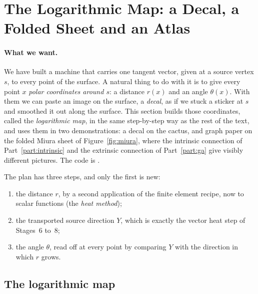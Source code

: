 \label{part:applications}

\section{The Logarithmic Map: a Decal, a Folded Sheet and an Atlas}
\label{section:app_logmap}

\paragraph{What we want.} We have built a machine that carries one tangent vector, given at a source vertex $s$, to every point of the surface. A natural thing to do with it is to give every point $x$ \emph{polar coordinates around $s$}: a distance $r(x)$ and an angle $\theta(x)$. With them we can paste an image on the surface, a \emph{decal}, as if we stuck a sticker at $s$ and smoothed it out along the surface. This section builds those coordinates, called the \emph{logarithmic map}, in the same step-by-step way as the rest of the text, and uses them in two demonstrations: a decal on the cactus, and graph paper on the folded Miura sheet of Figure~\ref{fig:miura}, where the intrinsic connection of Part~\ref{part:intrinsic} and the extrinsic connection of Part~\ref{part:ga} give visibly different pictures. The code is .

The plan has three steps, and only the first is new:
\begin{enumerate}
\item the distance $r$, by a second application of the finite element recipe, now to scalar functions (the \emph{heat method});
\item the transported source direction $Y$, which is exactly the vector heat step of Stages~6 to~8;
\item the angle $\theta$, read off at every point by comparing $Y$ with the direction in which $r$ grows.
\end{enumerate}

\subsection{The logarithmic map}


